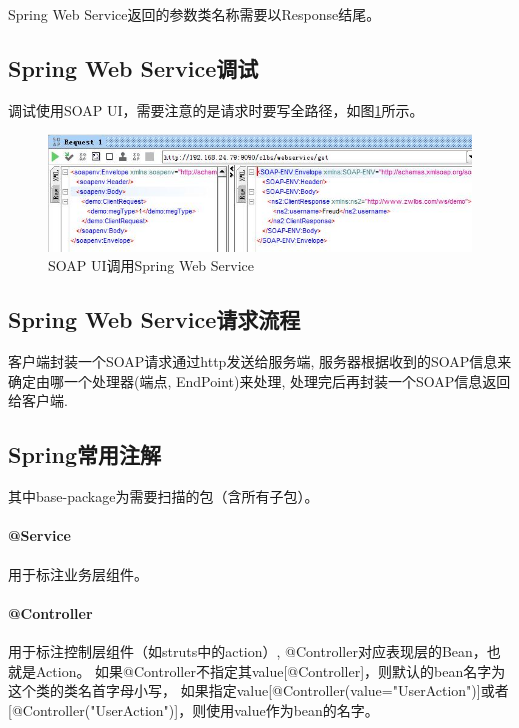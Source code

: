 \documentclass{book}
\begin{document}
Spring Web Service返回的参数类名称需要以Response结尾。

\subsection{Spring Web Service调试}

调试使用SOAP UI，需要注意的是请求时要写全路径，如图\ref{fig:SoapUIRequest}所示。

\begin{figure}[htbp]
	\centering
	\includegraphics[scale=0.6]{SoapUIRequest.jpg}
	\caption{SOAP UI调用Spring Web Service}
	\label{fig:SoapUIRequest}
\end{figure}

\subsection{Spring Web Service请求流程}

客户端封装一个SOAP请求通过http发送给服务端, 服务器根据收到的SOAP信息来确定由哪一个处理器(端点, EndPoint)来处理, 处理完后再封装一个SOAP信息返回给客户端.

\subsection{Spring常用注解}

其中base-package为需要扫描的包（含所有子包）。


\paragraph{@Service}用于标注业务层组件。

\paragraph{@Controller}用于标注控制层组件（如struts中的action）,
@Controller对应表现层的Bean，也就是Action。
如果@Controller不指定其value[@Controller]，则默认的bean名字为这个类的类名首字母小写，
如果指定value[@Controller(value="UserAction")]或者[@Controller("UserAction")]，则使用value作为bean的名字。
\end{document}
